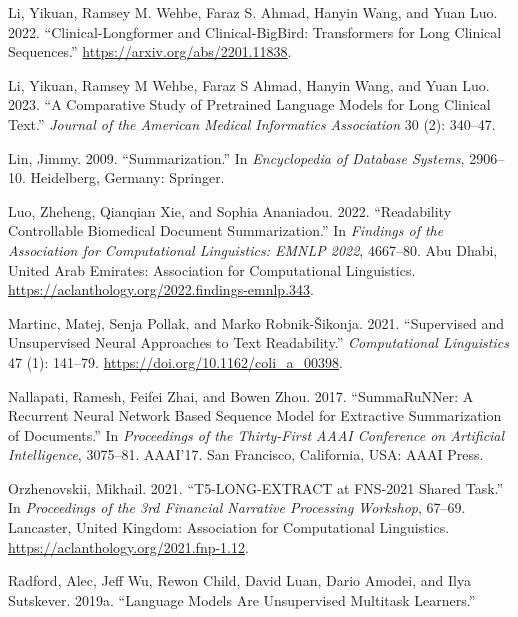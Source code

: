 \documentclass[
]{article}
\newlength{\cslhangindent}
\newlength{\cslentryspacingunit} %
\newenvironment{CSLReferences}[2] %
 {%
  \setlength{\parindent}{0pt}
  \ifodd #1
  \let\oldpar\par
  \def\par{\hangindent=\cslhangindent\oldpar}
  \fi
  \setlength{\parskip}{#2\cslentryspacingunit}
 }%
 {}
\begin{document}
\begin{CSLReferences}{1}{0}
\leavevmode{}%
Li, Yikuan, Ramsey M. Wehbe, Faraz S. Ahmad, Hanyin Wang, and Yuan Luo.
2022. {``Clinical-Longformer and Clinical-BigBird: Transformers for Long
Clinical Sequences.''} \url{https://arxiv.org/abs/2201.11838}.

\leavevmode{}%
Li, Yikuan, Ramsey M Wehbe, Faraz S Ahmad, Hanyin Wang, and Yuan Luo.
2023. {``A Comparative Study of Pretrained Language Models for Long
Clinical Text.''} \emph{Journal of the American Medical Informatics
Association} 30 (2): 340--47.

\leavevmode{}%
Lin, Jimmy. 2009. {``Summarization.''} In \emph{Encyclopedia of Database
Systems}, 2906--10. Heidelberg, Germany: Springer.

\leavevmode{}%
Luo, Zheheng, Qianqian Xie, and Sophia Ananiadou. 2022. {``Readability
Controllable Biomedical Document Summarization.''} In \emph{Findings of
the Association for Computational Linguistics: EMNLP 2022}, 4667--80.
Abu Dhabi, United Arab Emirates: Association for Computational
Linguistics. \url{https://aclanthology.org/2022.findings-emnlp.343}.

\leavevmode{}%
Martinc, Matej, Senja Pollak, and Marko Robnik-Šikonja. 2021.
{``{Supervised and Unsupervised Neural Approaches to Text
Readability}.''} \emph{Computational Linguistics} 47 (1): 141--79.
\url{https://doi.org/10.1162/coli_a_00398}.

\leavevmode{}%
Nallapati, Ramesh, Feifei Zhai, and Bowen Zhou. 2017. {``SummaRuNNer: A
Recurrent Neural Network Based Sequence Model for Extractive
Summarization of Documents.''} In \emph{Proceedings of the Thirty-First
AAAI Conference on Artificial Intelligence}, 3075--81. AAAI'17. San
Francisco, California, USA: AAAI Press.

\leavevmode{}%
Orzhenovskii, Mikhail. 2021. {``T5-{LONG}-{EXTRACT} at {FNS}-2021 Shared
Task.''} In \emph{Proceedings of the 3rd Financial Narrative Processing
Workshop}, 67--69. Lancaster, United Kingdom: Association for
Computational Linguistics. \url{https://aclanthology.org/2021.fnp-1.12}.

\leavevmode{}%
Radford, Alec, Jeff Wu, Rewon Child, David Luan, Dario Amodei, and Ilya
Sutskever. 2019a. {``Language Models Are Unsupervised Multitask
Learners.''}


\end{CSLReferences}
\end{document}
